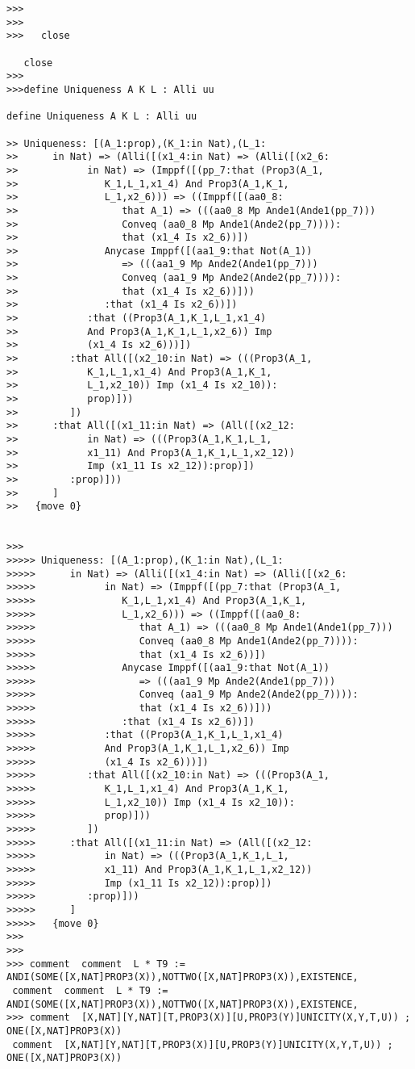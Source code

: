 \documentclass{article}
\begin{document}
\begin{verbatim}
>>>
>>>
>>>   close

   close
>>>
>>>define Uniqueness A K L : Alli uu

define Uniqueness A K L : Alli uu

>> Uniqueness: [(A_1:prop),(K_1:in Nat),(L_1:
>>      in Nat) => (Alli([(x1_4:in Nat) => (Alli([(x2_6:
>>            in Nat) => (Imppf([(pp_7:that (Prop3(A_1,
>>               K_1,L_1,x1_4) And Prop3(A_1,K_1,
>>               L_1,x2_6))) => ((Imppf([(aa0_8:
>>                  that A_1) => (((aa0_8 Mp Ande1(Ande1(pp_7)))
>>                  Conveq (aa0_8 Mp Ande1(Ande2(pp_7)))):
>>                  that (x1_4 Is x2_6))])
>>               Anycase Imppf([(aa1_9:that Not(A_1))
>>                  => (((aa1_9 Mp Ande2(Ande1(pp_7)))
>>                  Conveq (aa1_9 Mp Ande2(Ande2(pp_7)))):
>>                  that (x1_4 Is x2_6))]))
>>               :that (x1_4 Is x2_6))])
>>            :that ((Prop3(A_1,K_1,L_1,x1_4)
>>            And Prop3(A_1,K_1,L_1,x2_6)) Imp
>>            (x1_4 Is x2_6)))])
>>         :that All([(x2_10:in Nat) => (((Prop3(A_1,
>>            K_1,L_1,x1_4) And Prop3(A_1,K_1,
>>            L_1,x2_10)) Imp (x1_4 Is x2_10)):
>>            prop)]))
>>         ])
>>      :that All([(x1_11:in Nat) => (All([(x2_12:
>>            in Nat) => (((Prop3(A_1,K_1,L_1,
>>            x1_11) And Prop3(A_1,K_1,L_1,x2_12))
>>            Imp (x1_11 Is x2_12)):prop)])
>>         :prop)]))
>>      ]
>>   {move 0}


>>>
>>>>> Uniqueness: [(A_1:prop),(K_1:in Nat),(L_1:
>>>>>      in Nat) => (Alli([(x1_4:in Nat) => (Alli([(x2_6:
>>>>>            in Nat) => (Imppf([(pp_7:that (Prop3(A_1,
>>>>>               K_1,L_1,x1_4) And Prop3(A_1,K_1,
>>>>>               L_1,x2_6))) => ((Imppf([(aa0_8:
>>>>>                  that A_1) => (((aa0_8 Mp Ande1(Ande1(pp_7)))
>>>>>                  Conveq (aa0_8 Mp Ande1(Ande2(pp_7)))):
>>>>>                  that (x1_4 Is x2_6))])
>>>>>               Anycase Imppf([(aa1_9:that Not(A_1))
>>>>>                  => (((aa1_9 Mp Ande2(Ande1(pp_7)))
>>>>>                  Conveq (aa1_9 Mp Ande2(Ande2(pp_7)))):
>>>>>                  that (x1_4 Is x2_6))]))
>>>>>               :that (x1_4 Is x2_6))])
>>>>>            :that ((Prop3(A_1,K_1,L_1,x1_4)
>>>>>            And Prop3(A_1,K_1,L_1,x2_6)) Imp
>>>>>            (x1_4 Is x2_6)))])
>>>>>         :that All([(x2_10:in Nat) => (((Prop3(A_1,
>>>>>            K_1,L_1,x1_4) And Prop3(A_1,K_1,
>>>>>            L_1,x2_10)) Imp (x1_4 Is x2_10)):
>>>>>            prop)]))
>>>>>         ])
>>>>>      :that All([(x1_11:in Nat) => (All([(x2_12:
>>>>>            in Nat) => (((Prop3(A_1,K_1,L_1,
>>>>>            x1_11) And Prop3(A_1,K_1,L_1,x2_12))
>>>>>            Imp (x1_11 Is x2_12)):prop)])
>>>>>         :prop)]))
>>>>>      ]
>>>>>   {move 0}
>>>
>>>
>>> comment  comment  L * T9 := ANDI(SOME([X,NAT]PROP3(X)),NOTTWO([X,NAT]PROP3(X)),EXISTENCE,
 comment  comment  L * T9 := ANDI(SOME([X,NAT]PROP3(X)),NOTTWO([X,NAT]PROP3(X)),EXISTENCE,
>>> comment  [X,NAT][Y,NAT][T,PROP3(X)][U,PROP3(Y)]UNICITY(X,Y,T,U)) ; ONE([X,NAT]PROP3(X))
 comment  [X,NAT][Y,NAT][T,PROP3(X)][U,PROP3(Y)]UNICITY(X,Y,T,U)) ; ONE([X,NAT]PROP3(X))


\end{verbatim}
\end{document}

